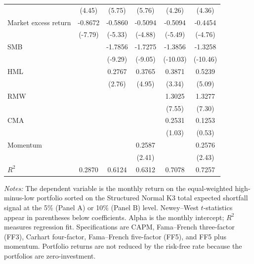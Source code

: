 \begin{table}[!htbp]
\begin{threeparttable}
\begin{tabular*}{\textwidth}{@{\extracolsep{\fill}}lccccc@{}}
 & {\scriptsize (4.45)} & {\scriptsize (5.75)} & {\scriptsize (5.76)} & {\scriptsize (4.26)} & {\scriptsize (4.36)} \\
\addlinespace[3pt]
Market excess return & -0.8672 & -0.5860 & -0.5094 & -0.5094 & -0.4454 \\[-2pt]
 & {\scriptsize (-7.79)} & {\scriptsize (-5.33)} & {\scriptsize (-4.88)} & {\scriptsize (-5.49)} & {\scriptsize (-4.76)} \\
\addlinespace[3pt]
SMB &  & -1.7856 & -1.7275 & -1.3856 & -1.3258 \\[-2pt]
 &  & {\scriptsize (-9.29)} & {\scriptsize (-9.05)} & {\scriptsize (-10.03)} & {\scriptsize (-10.46)} \\
\addlinespace[3pt]
HML &  & 0.2767 & 0.3765 & 0.3871 & 0.5239 \\[-2pt]
 &  & {\scriptsize (2.76)} & {\scriptsize (4.95)} & {\scriptsize (3.34)} & {\scriptsize (5.09)} \\
\addlinespace[3pt]
RMW &  &  &  & 1.3025 & 1.3277 \\[-2pt]
 &  &  &  & {\scriptsize (7.55)} & {\scriptsize (7.30)} \\
\addlinespace[3pt]
CMA &  &  &  & 0.2531 & 0.1253 \\[-2pt]
 &  &  &  & {\scriptsize (1.03)} & {\scriptsize (0.53)} \\
\addlinespace[3pt]
Momentum &  &  & 0.2587 &  & 0.2576 \\[-2pt]
 &  &  & {\scriptsize (2.41)} &  & {\scriptsize (2.43)} \\
\addlinespace[3pt]
\addlinespace[2pt]
$R^2$ & 0.2870 & 0.6124 & 0.6312 & 0.7078 & 0.7257 \\
\bottomrule
\end{tabular*}
\begin{tablenotes}[flushleft]
\footnotesize
\item \textit{Notes:} The dependent variable is the monthly return on the equal-weighted high-minus-low portfolio sorted on the Structured Normal K3 total expected shortfall signal at the 5\% (Panel A) or 10\% (Panel B) level. Newey--West $t$-statistics appear in parentheses below coefficients. Alpha is the monthly intercept; $R^2$ measures regression fit. Specifications are CAPM, Fama--French three-factor (FF3), Carhart four-factor, Fama--French five-factor (FF5), and FF5 plus momentum. Portfolio returns are not reduced by the risk-free rate because the portfolios are zero-investment.
\end{tablenotes}
\end{threeparttable}
\end{table}
